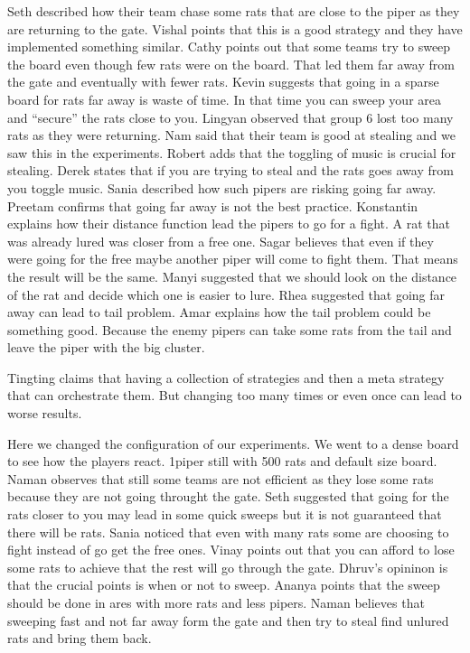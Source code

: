 Seth described how their team chase some rats that are close to the piper as they 
are returning to the gate.
Vishal points that this is a good strategy and they have implemented something similar.
Cathy points out that some teams try to sweep the board even though few rats were 
on the board. That led them far away from the gate and eventually with fewer rats.
Kevin suggests that going in a sparse board for rats far away is waste of time. 
In that time you can sweep your area and “secure” the rats close to you.
Lingyan observed that group 6 lost too many rats as they were returning.
Nam said that their team is good at stealing and we saw this in the experiments.
Robert adds that the toggling of music is crucial for stealing.
Derek states that if you are trying to steal and the rats goes away from you toggle music.
Sania described how such pipers are risking going far away.
Preetam confirms that going far away is not the best practice.
Konstantin explains how their distance function lead the pipers to go for a fight. 
A rat that was already lured was closer from a free one.
Sagar believes that even if they were going for the free maybe another piper will 
come to fight them. That means the result will be the same.
Manyi suggested that we should look on the distance of the rat and decide which 
one is easier to lure.
Rhea suggested that going far away can lead to tail problem.
Amar explains how the tail problem could be something good. Because the enemy 
pipers can take some rats from the tail and leave the piper with the big cluster.

Tingting claims that having a collection of strategies and then a meta strategy 
that can orchestrate them. But changing too many times or even once can lead to 
worse results.

Here we changed the configuration of our experiments. We went to a dense board to 
see how the players react. 1piper still with 500 rats and default size board.
Naman observes that still some teams are not efficient as they lose some rats 
because they are not going throught the gate.
Seth suggested that going for the rats closer to you may lead in some quick sweeps 
but it is not guaranteed that there will be rats.
Sania noticed that even with many rats some are choosing to fight instead of go get the free ones.
Vinay points out that you can afford to lose some rats to achieve that the rest will go through the gate.
Dhruv’s opininon is that the crucial points is when or not to sweep.
Ananya points that the sweep should be done in ares with more rats and less pipers.
Naman believes that sweeping fast and not far away form the gate and then try to 
steal find unlured rats and bring them back.

